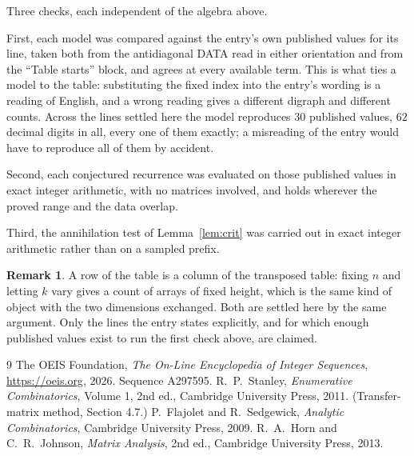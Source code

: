 \documentclass[11pt,a4paper]{article}
\theoremstyle{plain}
\theoremstyle{definition}
\newtheorem{remark}[theorem]{Remark}
\begin{document}
Three checks, each independent of the algebra above.

First, each model was compared against the entry's own published values for its line, taken
both from the antidiagonal DATA read in either orientation and from the ``Table starts''
block, and agrees at every available term. This is what ties a model to the table:
substituting the fixed index into the entry's wording is a reading of English, and a wrong
reading gives a different digraph and different counts. Across the lines settled here the
model reproduces $30$ published values, $62$ decimal digits in all, every one of
them exactly; a misreading of the entry would have to reproduce all of them by accident.

Second, each conjectured recurrence was evaluated on those published values in exact
integer arithmetic, with no matrices involved, and holds wherever the proved range and the
data overlap.

Third, the annihilation test of Lemma~\ref{lem:crit} was carried out in exact integer
arithmetic rather than on a sampled prefix.

\begin{remark}
A row of the table is a column of the transposed table: fixing $n$ and letting $k$ vary gives a
count of arrays of fixed height, which is the same kind of object with the two dimensions
exchanged. Both are settled here by the same argument. Only the lines the entry states
explicitly, and for which enough published values exist to run the first check above, are
claimed.
\end{remark}

\begin{thebibliography}{9}
 The OEIS Foundation, \emph{The On-Line Encyclopedia of Integer
Sequences}, \url{https://oeis.org}, 2026. Sequence A297595.
 R.~P.~Stanley, \emph{Enumerative Combinatorics}, Volume 1, 2nd ed.,
Cambridge University Press, 2011. (Transfer-matrix method, Section 4.7.)
 P.~Flajolet and R.~Sedgewick, \emph{Analytic Combinatorics}, Cambridge
University Press, 2009.
 R.~A.~Horn and C.~R.~Johnson, \emph{Matrix Analysis}, 2nd ed., Cambridge
University Press, 2013.
\end{thebibliography}
\end{document}
